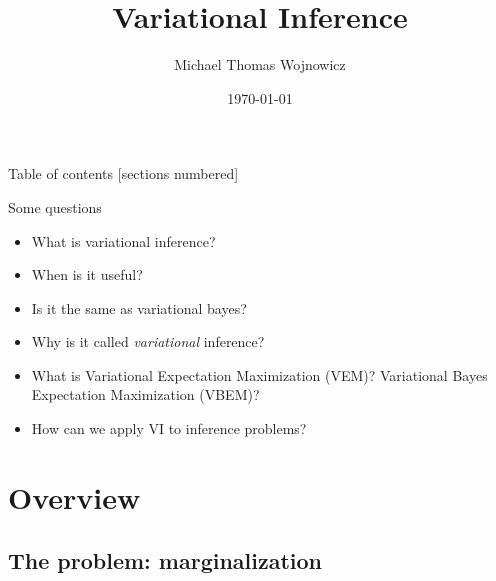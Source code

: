 \documentclass[10pt]{beamer}
\title{Variational Inference}
\date{\today}
\author{Michael Thomas Wojnowicz}
\institute{Data Intensive Studies Center, Tufts University}
\begin{document}
\maketitle

\begin{frame}{Table of contents}
  [sections numbered]
  \tableofcontents[hideallsubsections]
\end{frame}


\begin{frame}{Some questions}


\begin{itemize}
\item What is variational inference?
\item When is it useful?

\item Is it the same as variational bayes?

\item Why is it called \textit{variational} inference?

\item What is Variational Expectation Maximization (VEM)?  Variational Bayes Expectation Maximization (VBEM)?

\item How can we apply VI to inference problems?
\end{itemize}



\end{frame}



\section{Overview}



\subsection{The problem: marginalization}
\end{document}
